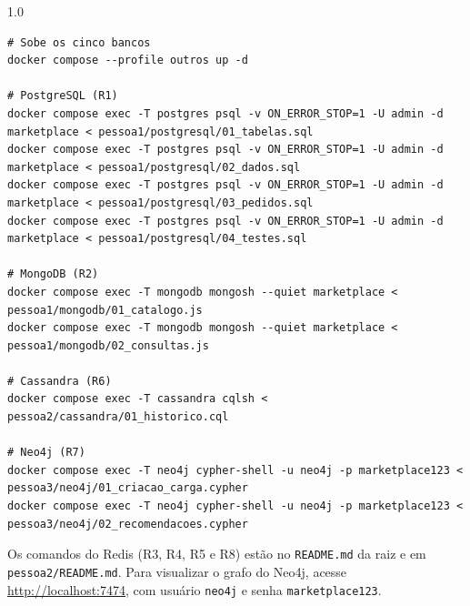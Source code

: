 \documentclass[12pt,a4paper,oneside]{article}
\begin{document}
\begin{spacing}{1.0}
\begin{lstlisting}
# Sobe os cinco bancos
docker compose --profile outros up -d

# PostgreSQL (R1)
docker compose exec -T postgres psql -v ON_ERROR_STOP=1 -U admin -d marketplace < pessoa1/postgresql/01_tabelas.sql
docker compose exec -T postgres psql -v ON_ERROR_STOP=1 -U admin -d marketplace < pessoa1/postgresql/02_dados.sql
docker compose exec -T postgres psql -v ON_ERROR_STOP=1 -U admin -d marketplace < pessoa1/postgresql/03_pedidos.sql
docker compose exec -T postgres psql -v ON_ERROR_STOP=1 -U admin -d marketplace < pessoa1/postgresql/04_testes.sql

# MongoDB (R2)
docker compose exec -T mongodb mongosh --quiet marketplace < pessoa1/mongodb/01_catalogo.js
docker compose exec -T mongodb mongosh --quiet marketplace < pessoa1/mongodb/02_consultas.js

# Cassandra (R6)
docker compose exec -T cassandra cqlsh < pessoa2/cassandra/01_historico.cql

# Neo4j (R7)
docker compose exec -T neo4j cypher-shell -u neo4j -p marketplace123 < pessoa3/neo4j/01_criacao_carga.cypher
docker compose exec -T neo4j cypher-shell -u neo4j -p marketplace123 < pessoa3/neo4j/02_recomendacoes.cypher
\end{lstlisting}
\end{spacing}

Os comandos do Redis (R3, R4, R5 e R8) estão no \texttt{README.md} da raiz e em \texttt{pessoa2/README.md}. Para visualizar o grafo do Neo4j, acesse \url{http://localhost:7474}, com usuário \texttt{neo4j} e senha \texttt{marketplace123}.
\end{document}
